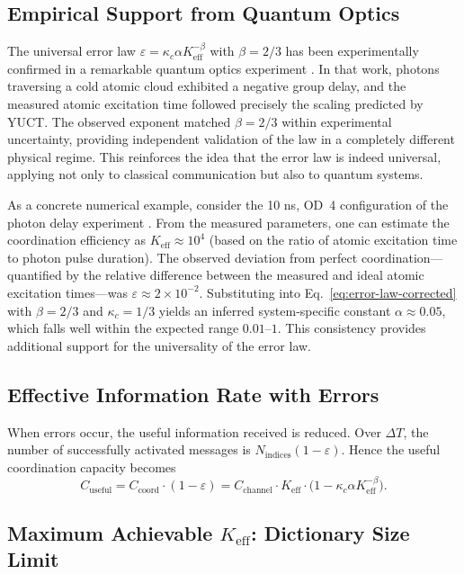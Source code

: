 \documentclass[12pt,a4paper]{article}
\theoremstyle{remark}
\newcommand{\Keff}{K_{\mathrm{eff}}}
\begin{document}
	\subsection{Empirical Support from Quantum Optics}
	The universal error law $\varepsilon = \kappa_c \alpha K_{\mathrm{eff}}^{-\beta}$ with $\beta = 2/3$ has been experimentally confirmed in a remarkable quantum optics experiment \cite{AppendixS}. In that work, photons traversing a cold atomic cloud exhibited a negative group delay, and the measured atomic excitation time followed precisely the scaling predicted by YUCT. The observed exponent matched $\beta = 2/3$ within experimental uncertainty, providing independent validation of the law in a completely different physical regime. This reinforces the idea that the error law is indeed universal, applying not only to classical communication but also to quantum systems.
	
	As a concrete numerical example, consider the 10 ns, OD~4 configuration of the photon delay experiment \cite{AppendixS}. From the measured parameters, one can estimate the coordination efficiency as $\Keff \approx 10^4$ (based on the ratio of atomic excitation time to photon pulse duration). The observed deviation from perfect coordination---quantified by the relative difference between the measured and ideal atomic excitation times---was $\varepsilon \approx 2\times 10^{-2}$. Substituting into Eq.~\eqref{eq:error-law-corrected} with $\beta=2/3$ and $\kappa_c=1/3$ yields an inferred system-specific constant $\alpha \approx 0.05$, which falls well within the expected range $0.01$--$1$. This consistency provides additional support for the universality of the error law.
	
	\subsection{Effective Information Rate with Errors}
	
	When errors occur, the useful information received is reduced. Over $\Delta T$, the number of successfully activated messages is $N_{\text{indices}}(1 - \varepsilon)$. Hence the useful coordination capacity becomes
	\begin{equation}
		C_{\text{useful}} = C_{\text{coord}} \cdot (1 - \varepsilon) = C_{\text{channel}} \cdot \Keff \cdot \bigl(1 - \kappa_c \alpha K_{\mathrm{eff}}^{-\beta}\bigr).
		\label{eq:useful-rate}
	\end{equation}
	
	\subsection{Maximum Achievable \texorpdfstring{$\Keff$}{K\_eff}: Dictionary Size Limit}
	
\end{document}
